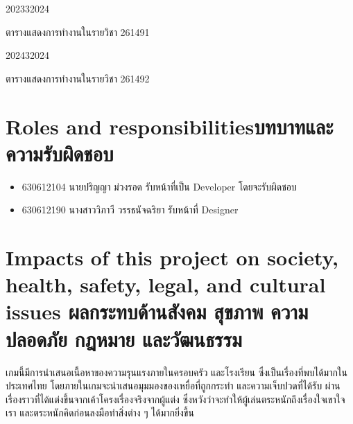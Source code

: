\begin{plan}{6}{2023}{3}{2024}
    \caption[ตารางการทำงานรายวิชา 261491]{ตารางแสดงการทำงานในรายวิชา 261491}
\end{plan}

\begin{plan}{1}{2024}{3}{2024}
    \caption[ตารางการทำงานรายวิชา 261492]{ตารางแสดงการทำงานในรายวิชา 261492}
\end{plan}

\section{\ifenglish Roles and responsibilities\else บทบาทและความรับผิดชอบ\fi}
\begin{itemize}
    \item[] 630612104 นายปริญญา ม่วงรอด รับหน้าที่เป็น Developer โดยจะรับผิดชอบ
    \item[] 630612190 นางสาววิภาวี วรรธนัจฉริยา รับหน้าที่ Designer
\end{itemize}

\section{\ifenglish%
      Impacts of this project on society, health, safety, legal, and cultural issues
  \else%
      ผลกระทบด้านสังคม สุขภาพ ความปลอดภัย กฎหมาย และวัฒนธรรม
  \fi}

เกมนี้มีการนำเสนอเนื้อหาของความรุนแรงภายในครอบครัว และโรงเรียน ซึ่งเป็นเรื่องที่พบได้มากในประเทศไทย 
โดยภายในเกมจะนำเสนอมุมมองของเหยื่อที่ถูกกระทำ และความเจ็บปวดที่ได้รับ ผ่านเรื่องราวที่ได้แต่งขึ้นจากเค้าโครงเรื่องจริงจากผู้แต่ง
ซึ่งหวังว่าจะทำให้ผู้เล่นตระหนักถึงเรื่องใจเขาใจเรา และตระหนักคิดก่อนลงมือทำสิ่งต่าง ๆ ได้มากยิ่งขึ้น

